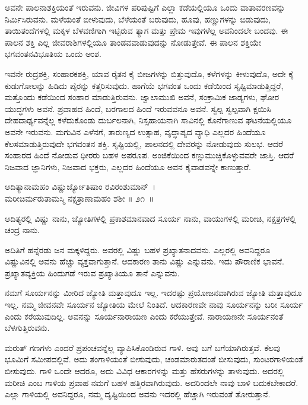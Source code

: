 ಅವನೇ ಪಾಲನಾಶಕ್ತಿಯಂತೆ ಇರುವನು. ಜೀವಿಗಳ ಪರಿಪುಷ್ಟಿಗೆ ಎಲ್ಲಾ ಕಡೆಯಲ್ಲಿಯೂ ಒಂದು ವಾತಾವರಣವನ್ನು ನಿರ್ಮಿಸಿರುವನು. ಮಳೆಯಂತೆ ಬೀಳುವುದು, ಬೆಳೆಯಂತೆ ಬರುವುದು, ಹೂವು, ಹಣ್ಣುಗಳನ್ನು ಬಿಡುವುದು, ತಾಯಿತಂದೆಗಳಲ್ಲಿ ಮಕ್ಕಳ ಬೆಳವಣಿಗಾಗಿ ಇಟ್ಟಿರುವ ತ್ಯಾಗ ಮತ್ತು ಪ್ರೇಮ ಇವುಗಳೆಲ್ಲ ಅವನಿಂದಲೇ ಬಂದವು. ಈ ಪಾಲನ ಶಕ್ತಿ ಎಲ್ಲ ಜೀವರಾಶಿ\-ಗಳಲ್ಲಿಯೂ ತಾಂಡವವಾಡುವುದನ್ನು ನೋಡುತ್ತೇವೆ. ಈ ಪಾಲನ ಶಕ್ತಿಯೇ ಭಗವಂತನ\break ವಿಭೂತಿಯ ಒಂದು ಅಂಶ.

ಇವನೇ ರುದ್ರಶಕ್ತಿ, ಸಂಹಾರಕಶಕ್ತಿ, ಯಾವ ರೈತನ ಕೈ ಬೀಜಗಳನ್ನು ಬಿತ್ತುವುದೊ, ಕಳೆಗಳನ್ನು ಕೀಳುವುದೊ, ಅದೇ ಕೈ ಕುಡುಗೋಲನ್ನು ಹಿಡಿದು ಪೈರನ್ನು ಕತ್ತರಿಸುವುದು. ಹಾಗೆಯೆ ಭಗವಂತ ಒಂದು ಕಡೆಯಿಂದ ಸೃಷ್ಟಿಮಾಡುತ್ತಿದ್ದರೆ, ಮತ್ತೊಂದು ಕಡೆಯಿಂದ ಸಂಹಾರ ಮಾಡುತ್ತಿರುವನು. ಜ್ವಾಲಾಮುಖಿ ಅವನೆ, ಸಂಕ್ರಾಮಿಕ ಜಾಡ್ಯಗಳು, ಘೋರ ಯುದ್ಧಗಳು ಅವನೆ. ಪ್ರವಾಹದ ಹಿಂದೆ, ಬರಗಾಲದ ಹಿಂದೆ ಇರುವವನೂ ಅವನೆ. ಸ್ವಲ್ಪ ಸ್ವಲ್ಪವಾಗಿ ಕ್ಷಯಿಸಿ ದೇಹದಾರ್ಢ್ಯವನ್ನೆಲ್ಲ ಕಳೆದುಕೊಂಡು ದುರ್ಬಲನಾಗಿ, ನಿಸ್ಸಹಾಯನಾಗಿ ಸಾವಿನಲ್ಲಿ ಕೊನೆಗಾಣುವ ಘಟನೆಯಲ್ಲಿಯೂ ಅವನೇ ಇರುವನು. ಮಗುವಿನ ಎಳೆನಗೆ, ತಾರುಣ್ಯದ ಉತ್ಸಾಹ, ವೃದ್ಧಾಪ್ಯದ ವ್ಯಾಧಿ ಎಲ್ಲದರ ಹಿಂದೆಯೂ ಕೆಲಸಮಾಡುತ್ತಿರುವುದೇ ಭಗವಂತನ ಶಕ್ತಿ. ಸೃಷ್ಟಿಯಲ್ಲಿ, ಪಾಲನದಲ್ಲಿ ದೇವರನ್ನು ನೋಡುವುದು ಸುಲಭ. ಆದರೆ ಸಂಹಾರದ ಹಿಂದೆ ನೋಡುವ ಧೀರರು ಬಹಳ ಅಪರೂಪ. ಅಂಜಿಕೆಯಿಂದ ಕಣ್ಣುಮುಚ್ಚಿಕೊಳ್ಳುವವರೇ ಜಾಸ್ತಿ. ಆದರೆ ನಿಜವಾದ ಜ್ಞಾನಿಗಳು, ನಿಜವಾದ ಭಕ್ತರು, ಎಲ್ಲದರ ಹಿಂದೆಯೂ ಅವನ ಕೈವಾಡವನ್ನೇ ಕಾಣುತ್ತಾರೆ.

\begin{shloka}
ಆದಿತ್ಯಾನಾಮಹಂ ವಿಷ್ಣುರ್ಜ್ಯೋತಿಷಾಂ ರವಿರಂಶುಮಾನ್~।\\ಮರೀಚಿರ್ಮರುತಾಮಸ್ಮಿ ನಕ್ಷತ್ರಾಣಾಮಹಂ ಶಶೀ \hfill॥ ೨೧~॥
\end{shloka}

\begin{artha}
ಆದಿತ್ಯರಲ್ಲಿ ವಿಷ್ಣು ನಾನು, ಜ್ಯೋತಿಗಳಲ್ಲಿ ಪ್ರಕಾಶಮಾನವಾದ ಸೂರ್ಯ ನಾನು, ವಾಯುಗಳಲ್ಲಿ ಮರೀಚಿ, ನಕ್ಷತ್ರಗಳಲ್ಲಿ ಚಂದ್ರ ನಾನು.
\end{artha}

ಅದಿತಿಗೆ ಹನ್ನೆರಡು ಜನ ಮಕ್ಕಳಿದ್ದರು. ಅವರಲ್ಲಿ ವಿಷ್ಣು ಬಹಳ ಪ್ರಖ್ಯಾತನಾದವನು. ಎಲ್ಲರಲ್ಲಿ ಅವನಿದ್ದರೂ ವಿಷ್ಣುವಿನಲ್ಲಿ ಅವನು ಹೆಚ್ಚು ವ್ಯಕ್ತವಾಗುತ್ತಾನೆ. ಆದಕಾರಣ ತಾನು ವಿಷ್ಣು ಎನ್ನುವನು. ಇದು ಪೌರಾಣಿಕ ಭಾವನೆ. ಪ್ರಖ್ಯಾತವ್ಯಕ್ತಿಯ ಹಿಂದುಗಡೆ ಇರುವ ಪ್ರಖ್ಯಾತಿಯೂ ತಾನೆ ಎನ್ನುವನು.

ನಮಗೆ ಸೂರ್ಯನನ್ನು ಮೀರಿದ ಜ್ಯೋತಿ ಮತ್ತಾವುದೂ ಇಲ್ಲ. ಇದರಷ್ಟು ಪ್ರಯೋಜನವಾಗಿರುವ ಜ್ಯೋತಿ ಮತ್ತಾವುದೂ ಇಲ್ಲ. ನಮ್ಮ ಜೀವನವೇ ಸೂರ್ಯನ ಜ್ಯೋತಿಯ ಮೇಲೆ ನಿಂತಿದೆ. ಆದಕಾರಣವೇ ನಾವು ಸೂರ್ಯನನ್ನು ಬರೀ ಸೂರ್ಯ ಎಂದು ಕರೆಯುವುದಿಲ್ಲ. ಅವನನ್ನು ಸೂರ್ಯನಾರಾಯಣ ಎಂದು ಕರೆಯುತ್ತೇವೆ. ನಾರಾಯಣನೇ ಸೂರ್ಯನಂತೆ ಬೆಳಗುತ್ತಿರುವನು.

ಮರುತ್ ಗಣಗಳು ಎಂದರೆ ಪ್ರಪಂಚವನ್ನೆಲ್ಲ ವ್ಯಾಪಿಸಿಕೊಂಡಿರುವ ಗಾಳಿ. ಅವು ಬಗೆ ಬಗೆಯಾಗಿರುತ್ತವೆ. ಕೆಲವು ಭೂಮಿಗೆ ಸಮೀಪದಲ್ಲಿವೆ. ಅದು ತಂಗಾಳಿಯಂತೆ ಬೀಸುವುದು, ಚಂಡಮಾರುತದಂತೆ ಬೀಸುವುದು, ಸುಂಟರಗಾಳಿಯಂತೆ ಬೀಸುವುದು. ಗಾಳಿ ಒಂದೇ ಆದರೂ, ಅದು ವಿವಿಧ ಆಕಾರಗಳನ್ನು ಮತ್ತು ಹೆಸರುಗಳನ್ನು ತಾಳುವುದು. ಅದರಲ್ಲಿ ಮರೀಚಿ ಎಂಬ ಗಾಳಿಯ ಪ್ರವಾಹ ನಮಗೆ ಬಹಳ ಹತ್ತಿರವಾಗಿರುವುದು. ಅದರಿಂದಲೇ ನಾವು ಬಾಳಿ ಬದುಕ\-ಬೇಕಾದರೆ. ಎಲ್ಲಾ ಗಾಳಿಯಲ್ಲಿ ಅವನಿದ್ದರೂ, ನಮ್ಮ ದೃಷ್ಟಿಯಿಂದ ಅವನು ಇದರಲ್ಲಿ ಹೆಚ್ಚಾಗಿ ಇರುವಂತೆ ತೋರುತ್ತಾನೆ.

